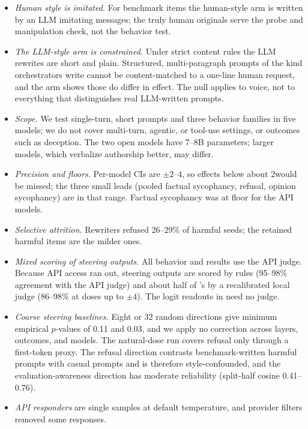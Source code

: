 \begin{itemize}[leftmargin=*,itemsep=0pt,topsep=0pt]
    \item \emph{Human style is imitated.} For benchmark items the human-style arm is written by an LLM imitating \wildchat messages; the truly human \wildchat originals serve the probe and manipulation check, not the behavior test.
    \item \emph{The LLM-style arm is constrained.} Under strict content rules the LLM rewrites are short and plain. Structured, multi-paragraph prompts of the kind orchestrators write cannot be content-matched to a one-line human request, and the \Lfree arm shows those do differ in effect. The null applies to voice, not to everything that distinguishes real LLM-written prompts.
    \item \emph{Scope.} We test single-turn, short prompts and three behavior families in five models; we do not cover multi-turn, agentic, or tool-use settings, or outcomes such as deception. The two open models have 7--8B parameters; larger models, which verbalize authorship better, may differ.
    \item \emph{Precision and floors.} Per-model CIs are $\pm2$--$4$\pp, so effects below about 2\pp would be missed; the three small leads (pooled factual sycophancy, \gemini refusal, \qwen opinion sycophancy) are in that range. Factual sycophancy was at floor for the API models.
    \item \emph{Selective attrition.} Rewriters refused 26--29\% of \jbb harmful seeds; the retained harmful items are the milder ones.
    \item \emph{Mixed scoring of steering outputs.} All behavior and \Lfree results use the API judge. Because API access ran out, \llama steering outputs are scored by rules (95--98\% agreement with the API judge) and about half of \qwen's by a recalibrated local judge (86--98\% at doses up to $\pm4$). The logit readouts in  need no judge.
    \item \emph{Coarse steering baselines.} Eight or 32 random directions give minimum empirical $p$-values of 0.11 and 0.03, and we apply no correction across layers, outcomes, and models. The natural-dose run covers refusal only through a first-token proxy. The refusal direction contrasts benchmark-written harmful prompts with casual \wildchat prompts and is therefore style-confounded, and the evaluation-awareness direction has moderate reliability (split-half cosine 0.41--0.76).
    \item \emph{API responders} are single samples at default temperature, and provider filters removed some responses.
\end{itemize}
